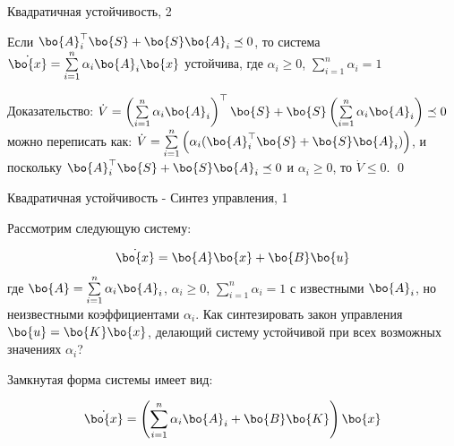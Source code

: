 \documentclass{beamer}
\begin{document}
\begin{frame}{Квадратичная устойчивость, 2}
	\begin{flushleft}
		
		\begin{theorem}
			Если $\bo{A}_i^\top \bo{S} + \bo{S} \bo{A}_i \preceq 0$, то система $\dot{\bo{x}}  = \sum\limits_{i=1}^{n} \alpha_i \bo{A}_i \bo{x}$ устойчива, где $\alpha_i \geq 0$, $\sum\limits_{i=1}^{n} \alpha_i = 1$
		\end{theorem}
		
		\bigskip
		
		Доказательство: $\dot V = \left(\sum\limits_{i=1}^{n} \alpha_i \bo{A}_i \right)^\top \bo{S} + \bo{S} 
		\left( \sum\limits_{i=1}^{n} \alpha_i \bo{A}_i \right) \preceq 0$ можно переписать как: 
		$\dot V = \sum\limits_{i=1}^{n} \left( \alpha_i (\bo{A}_i^\top \bo{S} + \bo{S} \bo{A}_i) \right) $, и поскольку $\bo{A}_i^\top \bo{S} + \bo{S} \bo{A}_i \preceq 0$ и $\alpha_i \geq 0$, то $\dot V \leq 0$. \qed
		
	\end{flushleft}
\end{frame}

\begin{frame}{Квадратичная устойчивость - Синтез управления, 1}
	\begin{flushleft}
		
		Рассмотрим следующую систему:
		
		\begin{equation}
			\dot{\bo{x}}  = \bo{A}\bo{x} + \bo{B}\bo{u}
		\end{equation}
		где $\bo{A} = \sum\limits_{i=1}^{n} \alpha_i \bo{A}_i$, $\alpha_i \geq 0$, $\sum\limits_{i=1}^{n} \alpha_i = 1$ с известными $\bo{A}_i$, но неизвестными коэффициентами $\alpha_i$. Как синтезировать закон управления $\bo{u} = \bo{K}\bo{x}$, делающий систему устойчивой при всех возможных значениях $\alpha_i$? 
		
		\bigskip
		
		Замкнутая форма системы имеет вид:
		
		\begin{equation}
			\dot{\bo{x}}  = \left(\sum\limits_{i=1}^{n} \alpha_i \bo{A}_i + \bo{B}\bo{K}\right)\bo{x}
		\end{equation}
		
		
	\end{flushleft}
\end{frame}
\end{document}
